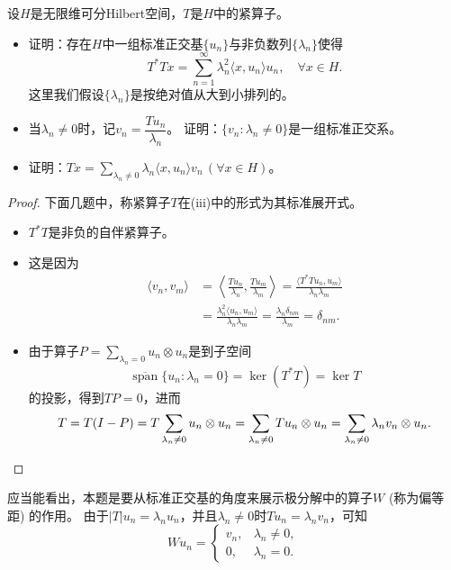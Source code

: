 \begin{2}
    设$H$是无限维可分Hilbert空间，$T$是$H$中的紧算子。
    \begin{itemize}
    \item[(i)] 证明：存在$H$中一组标准正交基$\{u_n\}$与非负数列$\{\lambda_n\}$使得
    \[T^*Tx=\sum_{n=1}^{\infty}\lambda_n^2\langle x,u_n \rangle u_n,\quad\forall x \in H.\]
    这里我们假设$\{\lambda_n\}$是按绝对值从大到小排列的。
    \item[(ii)] 当$\lambda_n\ne0$时，记$v_n=\dfrac{Tu_n}{\lambda_n}$。
    证明：$\{v_n:\lambda_n\ne0\}$是一组标准正交系。
    \item[(iii)] 证明：$\displaystyle Tx=\sum_{\lambda_n\ne0}\lambda_n\langle x,u_n \rangle v_n\,(\forall x \in H)$。
    \end{itemize}
\end{2}
\begin{proof}
    下面几题中，称紧算子$T$在(iii)中的形式为其标准展开式。
    \begin{itemize}
    \item[(i)] $T^*T$是非负的自伴紧算子。
    \item[(ii)] 这是因为
    \begin{align*}
        \langle v_n,v_m \rangle&=\left\langle\frac{Tu_n}{\lambda_n},
        \frac{Tu_m}{\lambda_m}\right\rangle
        =\frac{\langle T^*Tu_n,u_m \rangle}{\lambda_n\lambda_m}\\
        &=\frac{\lambda_n^2\langle u_n,u_m \rangle}{\lambda_n\lambda_m}
        =\frac{\lambda_n\delta_{nm}}{\lambda_m}=\delta_{nm}.
    \end{align*}
    \item[(iii)] 由于算子$\displaystyle P=\sum_{\lambda_n=0}u_n \otimes u_n$是到子空间
    \[\overline{\operatorname{span}}\{u_n:\lambda_n=0\}=\ker(T^*T)=\ker T\]
    的投影，得到$TP=0$，进而
    \[T=T(I-P)=T\sum_{\lambda_n\ne0}u_n \otimes u_n
    =\sum_{\lambda_n\ne0}Tu_n \otimes u_n
    =\sum_{\lambda_n\ne0}\lambda_nv_n \otimes u_n.\qedhere\]
    \end{itemize}
\end{proof}
\begin{remark*}
    应当能看出，本题是要从标准正交基的角度来展示极分解中的算子$W$ (称为偏等距) 的作用。
    由于$|T|u_n=\lambda_nu_n$，并且$\lambda_n\ne0$时$Tu_n=\lambda_nv_n$，可知
    \[Wu_n=\begin{cases}v_n,&\lambda_n\ne0,\\0,&\lambda_n=0.\end{cases}\]
\end{remark*}

